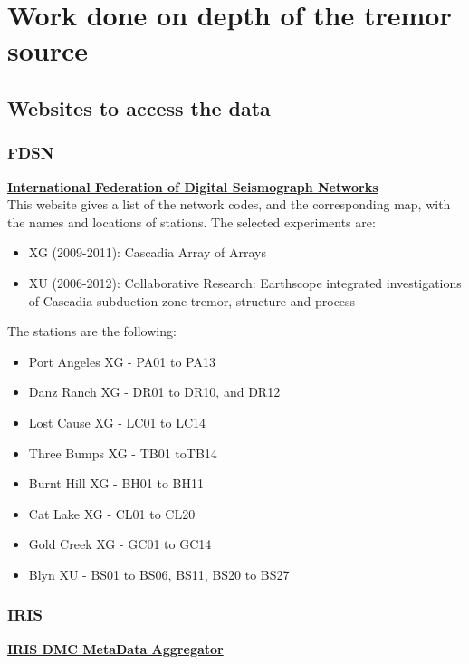 \documentclass[workdone.tex]{subfiles}
\begin{document}
\chapter{Work done on depth of the tremor source}

\section{Websites to access the data}

\subsection{FDSN}

\href{http://www.fdsn.org/networks/}{\textbf{International Federation of Digital Seismograph Networks}} \\

This website gives a list of the network codes, and the corresponding map, with the names and locations of stations. The selected experiments are:
\begin{itemize}
	\item XG (2009-2011): Cascadia Array of Arrays
	\item XU (2006-2012): Collaborative Research: Earthscope integrated investigations of Cascadia subduction zone tremor, structure and process
\end{itemize}

The stations are the following:
\begin{itemize}
	\item Port Angeles XG - PA01 to PA13
	\item Danz Ranch XG - DR01 to DR10, and DR12
	\item Lost Cause XG - LC01 to LC14
	\item Three Bumps XG - TB01 toTB14
	\item Burnt Hill XG - BH01 to BH11
	\item Cat Lake XG - CL01 to CL20
	\item Gold Creek XG - GC01 to GC14
	\item Blyn XU - BS01 to BS06, BS11, BS20 to BS27
\end{itemize}

\subsection{IRIS}

\href{http://ds.iris.edu/mda}{\textbf{IRIS DMC MetaData Aggregator}} \\
\end{document}
